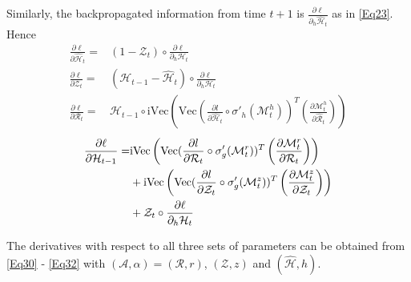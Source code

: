 \documentclass[journal]{IEEEtran}
\begin{document}
Similarly, the backpropagated information from time $t+1$ is $\frac{\partial \ell}{\partial_h \widehat{\mathcal{H}}_t}$ as in \eqref{Eq23}. Hence 
\begin{align}
\frac{\partial \ell}{\partial \widehat{\mathcal{H}}_t} =& ( 1-\mathcal{Z}_t)\circ \frac{\partial \ell}{\partial_h {\mathcal{H}}_t} \label{Eq36}\\
\frac{\partial \ell}{\partial {\mathcal{Z}}_t} =& (\mathcal{H}_{t-1} -\widehat{\mathcal{H}}_t)\circ \frac{\partial \ell}{\partial_h {\mathcal{H}}_t} \label{Eq37}\\
\frac{\partial \ell}{\partial {\mathcal{R}}_t} = & \mathcal{H}_{t-1}\circ \text{iVec}\left( \text{Vec}(\frac{\partial l}{\partial \widehat{\mathcal{H}}_{t}} \circ \sigma '_h(\mathcal{M}^h_t))^T \left(\frac{\partial \mathcal{M}^{h}_t}{\partial \widehat{\mathcal{R}}_{t}}\right)\right)%
\label{Eq38}
\end{align}
\begin{align}
\frac{\partial \ell}{\partial {\mathcal{H}}_{t-1}} =& \text{iVec}\left( \text{Vec}(\frac{\partial l}{\partial {\mathcal{R}}_{t}} \circ \sigma '_g(\mathcal{M}^r_t))^T \left(\frac{\partial \mathcal{M}^{r}_t}{\partial {\mathcal{R}}_{t}}\right)\right) \notag\\
&+\text{iVec}\left( \text{Vec}(\frac{\partial l}{\partial {\mathcal{Z}}_{t}} \circ \sigma '_g(\mathcal{M}^z_t))^T \left(\frac{\partial \mathcal{M}^{z}_t}{\partial {\mathcal{Z}}_{t}}\right)\right) \notag\\
& + \mathcal{Z}_t \circ \frac{\partial \ell}{\partial_h  {\mathcal{H}}_t} \label{Eq39}
\end{align}

The derivatives with respect to all three sets of parameters can be obtained from \eqref{Eq30} - \eqref{Eq32} with $(\mathcal{A}, \alpha) = (\mathcal{R}, r)$, $(\mathcal{Z}, z)$ and $(\widehat{\mathcal{H}}, h)$.
\end{document}
